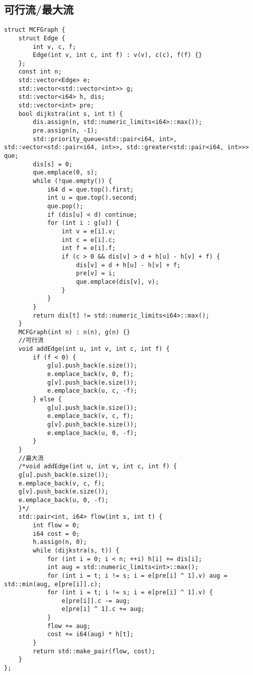 \subsection{可行流/最大流}
\begin{lstlisting}
struct MCFGraph {
    struct Edge {
        int v, c, f;
        Edge(int v, int c, int f) : v(v), c(c), f(f) {}
    };
    const int n;
    std::vector<Edge> e;
    std::vector<std::vector<int>> g;
    std::vector<i64> h, dis;
    std::vector<int> pre;
    bool dijkstra(int s, int t) {
        dis.assign(n, std::numeric_limits<i64>::max());
        pre.assign(n, -1);
        std::priority_queue<std::pair<i64, int>, std::vector<std::pair<i64, int>>, std::greater<std::pair<i64, int>>> que;
        dis[s] = 0;
        que.emplace(0, s);
        while (!que.empty()) {
            i64 d = que.top().first;
            int u = que.top().second;
            que.pop();
            if (dis[u] < d) continue;
            for (int i : g[u]) {
                int v = e[i].v;
                int c = e[i].c;
                int f = e[i].f;
                if (c > 0 && dis[v] > d + h[u] - h[v] + f) {
                    dis[v] = d + h[u] - h[v] + f;
                    pre[v] = i;
                    que.emplace(dis[v], v);
                }
            }
        }
        return dis[t] != std::numeric_limits<i64>::max();
    }
    MCFGraph(int n) : n(n), g(n) {}
    //可行流
    void addEdge(int u, int v, int c, int f) {
        if (f < 0) {
            g[u].push_back(e.size());
            e.emplace_back(v, 0, f);
            g[v].push_back(e.size());
            e.emplace_back(u, c, -f);
        } else {
            g[u].push_back(e.size());
            e.emplace_back(v, c, f);
            g[v].push_back(e.size());
            e.emplace_back(u, 0, -f);
        }
    }
    //最大流
    /*void addEdge(int u, int v, int c, int f) {
    g[u].push_back(e.size());
    e.emplace_back(v, c, f);
    g[v].push_back(e.size());
    e.emplace_back(u, 0, -f);
    }*/
    std::pair<int, i64> flow(int s, int t) {
        int flow = 0;
        i64 cost = 0;
        h.assign(n, 0);
        while (dijkstra(s, t)) {
            for (int i = 0; i < n; ++i) h[i] += dis[i];
            int aug = std::numeric_limits<int>::max();
            for (int i = t; i != s; i = e[pre[i] ^ 1].v) aug = std::min(aug, e[pre[i]].c);
            for (int i = t; i != s; i = e[pre[i] ^ 1].v) {
                e[pre[i]].c -= aug;
                e[pre[i] ^ 1].c += aug;
            }
            flow += aug;
            cost += i64(aug) * h[t];
        }
        return std::make_pair(flow, cost);
    }
};
\end{lstlisting}

